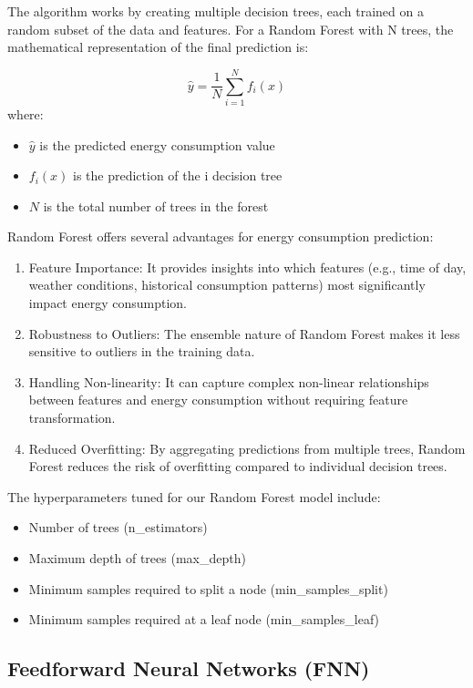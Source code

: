 The algorithm works by creating multiple decision trees, each trained on a random subset of the data and features. For a Random Forest with N trees, the mathematical representation of the final prediction is:

\[
\hat{y} = \frac{1}{N}\sum_{i=1}^{N} f_i(x)
\]
where:
\begin{itemize} 
    \item $\hat{y}$ is the predicted energy consumption value
    \item $f_i(x)$ is the prediction of the i decision tree
    \item $N$ is the total number of trees in the forest
\end{itemize}

Random Forest offers several advantages for energy consumption prediction:

\begin{enumerate}
    \item Feature Importance: It provides insights into which features (e.g., time of day, weather conditions, historical consumption patterns) most significantly impact energy consumption.
    \item Robustness to Outliers: The ensemble nature of Random Forest makes it less sensitive to outliers in the training data.
    \item Handling Non-linearity: It can capture complex non-linear relationships between features and energy consumption without requiring feature transformation.
    \item Reduced Overfitting: By aggregating predictions from multiple trees, Random Forest reduces the risk of overfitting compared to individual decision trees.
\end{enumerate}

The hyperparameters tuned for our Random Forest model include:

\begin{itemize}
    \item Number of trees (n\_estimators)
    \item Maximum depth of trees (max\_depth)
    \item Minimum samples required to split a node (min\_samples\_split)
    \item Minimum samples required at a leaf node (min\_samples\_leaf)
\end{itemize}

\subsection{Feedforward Neural Networks (FNN)}

